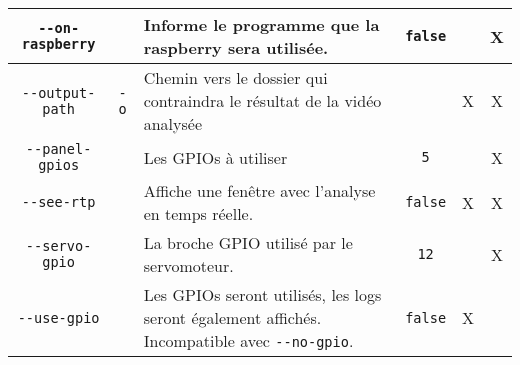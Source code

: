 \begin{table}[H]
\begin{tabularx}{\linewidth}{|c|c|X|c|c|c|}
        \texttt{-{}-on-raspberry}                            &                                                   & Informe le programme que la \gls{raspberry} sera utilisée.                                                      & \texttt{false}                                                &                                                           & X                                   \\\hline
        \texttt{-{}-output-path}                             & \texttt{-o}                                       & Chemin vers le dossier qui contraindra le résultat de la vidéo analysée                                         &                                                               & X                                                         & X                                   \\\hline
        \texttt{-{}-panel-gpios}                             &                                                   & Les GPIOs à utiliser                                                                                            & \texttt{5}                                                    &                                                           & X                                   \\\hline
        \texttt{-{}-see-rtp}                                 &                                                   & Affiche une fenêtre avec l'analyse en temps réelle.                                                             & \texttt{false}                                                & X                                                         & X                                   \\\hline
        \texttt{-{}-servo-gpio}                              &                                                   & La broche GPIO utilisé par le servomoteur.                                                                      & \texttt{12}                                                   &                                                           & X                                   \\\hline
        \texttt{-{}-use-gpio}                                &                                                   & Les GPIOs seront utilisés, les logs seront également affichés. Incompatible avec \texttt{-{}-no-gpio}.          & \texttt{false}                                                & X                                                         &                                     \\\hline

\end{tabularx}
\end{table}
